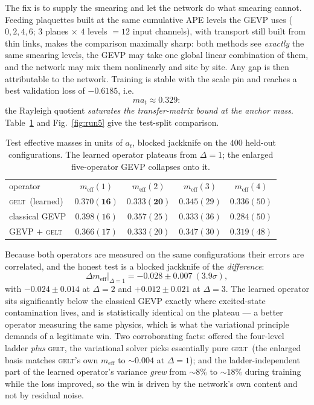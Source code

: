 \documentclass[aps,prl,reprint,superscriptaddress,nofootinbib]{revtex4-2}
\newcommand{\meff}{m_{\mathrm{eff}}}
\newcommand{\at}{a_t}
\newcommand{\GELT}{\textsc{gelt}}
\begin{document}
The fix is to supply the smearing and let the network do what smearing cannot.
Feeding plaquettes built at the same cumulative APE levels the GEVP uses
($0,2,4,6$; $3$ planes $\times$ $4$ levels $=12$ input channels), with transport
still built from thin links, makes the comparison maximally sharp: both methods
see \emph{exactly} the same smearing levels, the GEVP may take one global linear
combination of them, and the network may mix them nonlinearly and site by site.
Any gap is then attributable to the network. Training is stable with the scale
pin and reaches a best validation loss of $-0.6185$, i.e.
\begin{equation}
  m\at\approx0.329:
\end{equation}
the Rayleigh quotient \emph{saturates the transfer-matrix bound at the anchor
mass}. Table~\ref{tab:meff} and Fig.~\ref{fig:run5} give the test-split
comparison.

\begin{table}[t]
\caption{Test effective masses in units of $\at$, blocked jackknife on the $400$
held-out configurations. The learned operator plateaus from $\Delta=1$; the
enlarged five-operator GEVP collapses onto it.}
\label{tab:meff}
\begin{ruledtabular}
\begin{tabular}{lcccc}
operator & $\meff(1)$ & $\meff(2)$ & $\meff(3)$ & $\meff(4)$\\
\colrule
\GELT\ (learned) & $\bm{0.370(16)}$ & $\bm{0.333(20)}$ & $0.345(29)$ & $0.336(50)$ \\
classical GEVP & $0.398(16)$ & $0.357(25)$ & $0.333(36)$ & $0.284(50)$ \\
GEVP $+$ \GELT & $0.366(17)$ & $0.333(20)$ & $0.347(30)$ & $0.319(48)$ \\
\end{tabular}
\end{ruledtabular}
\end{table}

Because both operators are measured on the same configurations their errors are
correlated, and the honest test is a blocked jackknife of the \emph{difference}:
\begin{equation}
  \Delta\meff\big|_{\Delta=1}=-0.028\pm0.007\ (3.9\sigma),
\end{equation}
with $-0.024\pm0.014$ at $\Delta=2$ and $+0.012\pm0.021$ at $\Delta=3$. The
learned operator sits significantly below the classical GEVP exactly where
excited-state contamination lives, and is statistically identical on the plateau
--- a better operator measuring the same physics, which is what the variational
principle demands of a legitimate win. Two corroborating facts: offered the
four-level ladder \emph{plus} \GELT, the variational solver picks essentially
pure \GELT\ (the enlarged basis matches \GELT's own $\meff$ to $\sim0.004$ at
$\Delta=1$); and the ladder-independent part of the learned operator's variance
\emph{grew} from $\sim8\%$ to $\sim18\%$ during training while the loss improved,
so the win is driven by the network's own content and not by residual noise.
\end{document}
